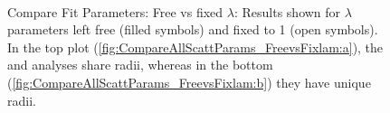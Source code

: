 \documentclass[/home/jesse/Analysis/FemtoAnalysis/AnalysisNotes/AnalysisNoteJBuxton.tex]{subfiles}
\begin{document}
\begin{figure}[h!]
  \centering
  \\  
  \caption[Compare Fit Parameters: Free vs fixed $\lambda$]{Compare Fit Parameters: Free vs fixed $\lambda$:  Results shown for $\lambda$ parameters left free (filled symbols) and fixed to 1 (open symbols).  In the top plot (\ref{fig:CompareAllScattParams_FreevsFixlam:a}), the \LamKchP and \LamKchM analyses share radii, whereas in the bottom (\ref{fig:CompareAllScattParams_FreevsFixlam:b}) they have unique radii.}
  \label{fig:CompareAllScattParams_FreevsFixlam}
\end{figure}
\end{document}
